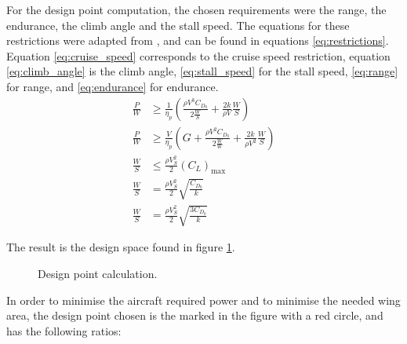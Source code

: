 \documentclass[english,fira]{ist-report}
\begin{document}
For the design point computation, the chosen requirements were the range, the endurance, the climb angle and the stall speed. The equations for these restrictions were adapted from  \cite{corke}, and can be found in equations \ref{eq:restrictions}. Equation \ref{eq:cruise_speed} corresponds to the cruise speed restriction, equation \ref{eq:climb_angle} is the climb angle, \ref{eq:stall_speed} for the stall speed, \ref{eq:range} for range, and \ref{eq:endurance} for endurance.
\begin{subequations}\label{eq:restrictions}
    \begin{align}
        \frac{P}{W} &\geq \frac{1}{\eta_p}\left(\frac{\rho V^3C_{D_0}}{2\frac{W}{S}} + \frac{2k}{\rho V}\frac{W}{S}\right) \label{eq:cruise_speed} \\
        \frac{P}{W} &\geq \frac{V}{\eta_p}\left(G + \frac{\rho V^2 C_{D_0}}{2\frac{W}{W}} + \frac{2k}{\rho V^2}\frac{W}{S}\right) \label{eq:climb_angle} \\
        \frac{W}{S} &\leq \frac{\rho V_S^2}{2}\left(C_L\right)_{\text{max}} \label{eq:stall_speed} \\
        \frac{W}{S} &= \frac{\rho V_S^2}{2}\sqrt{\frac{C_{D_0}}{k}} \label{eq:range} \\
        \frac{W}{S} &= \frac{\rho V_S^2}{2}\sqrt{\frac{3C_{D_0}}{k}} \label{eq:endurance}
    \end{align}
\end{subequations}


The result is the design space found in figure \ref{fig:dp_space_tikz}.


\begin{figure}[ht]
    \centering
    
    \caption{Design point calculation.}
    \label{fig:dp_space_tikz}
\end{figure}

In order to minimise the aircraft required power and to minimise the needed wing area, the design point chosen is the marked in the figure with a red circle, and has the following ratios: 
\end{document}
